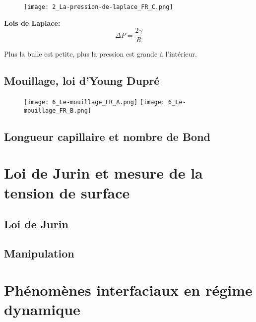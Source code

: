 \documentclass[10pt]{beamer}
\begin{document}
\begin{frame}{\insertsubsection}
    \begin{multicols*}{2}
        \begin{figure}
            \centering
            \texttt{[image: 2\_La-pression-de-laplace\_FR\_C.png]}
        \end{figure}


        \textbf{Lois de Laplace:}\\

        \begin{equation}
            \Delta P = \dfrac{2\gamma}{R}
        \end{equation}

        Plus la bulle est petite, plus la pression est grande à l'intérieur.
    \end{multicols*}
\end{frame}


\subsection{Mouillage, loi d'Young Dupré}

\begin{frame}{\insertsubsection}
    \begin{figure}
        \centering
        \texttt{[image: 6\_Le-mouillage\_FR\_A.png]}
        \texttt{[image: 6\_Le-mouillage\_FR\_B.png]}
    \end{figure}
\end{frame}


\subsection{Longueur capillaire et nombre de Bond}
\section{Loi de Jurin et mesure de la tension de surface}
\subsection{Loi de Jurin}
\subsection{Manipulation}
\section{Phénomènes interfaciaux en régime dynamique}
\end{document}
